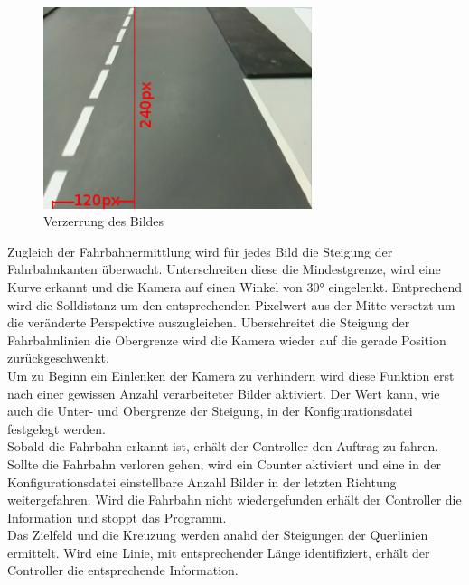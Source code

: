 \begin{figure}[H]%
\centering
\includegraphics[width=0.7\textwidth]{03_Loesungskonzept/pictures/Verzerrung.png}
\caption{Verzerrung des Bildes}
\label{fig:routeCorr}
\end{figure}
Zugleich der Fahrbahnermittlung wird für jedes Bild die Steigung der Fahrbahnkanten überwacht. Unterschreiten diese die Mindestgrenze, wird eine Kurve erkannt und die Kamera auf einen Winkel von 30° eingelenkt. Entprechend wird die Solldistanz um den entsprechenden Pixelwert aus der Mitte versetzt um die veränderte Perspektive auszugleichen. Uberschreitet die Steigung der Fahrbahnlinien die Obergrenze wird die Kamera wieder auf die gerade Position zurückgeschwenkt.\\
Um zu Beginn ein Einlenken der Kamera zu verhindern wird diese Funktion erst nach einer gewissen Anzahl verarbeiteter Bilder aktiviert. Der Wert kann, wie auch die Unter- und Obergrenze der Steigung, in der Konfigurationsdatei festgelegt werden.\\
Sobald die Fahrbahn erkannt ist, erhält der Controller den Auftrag zu fahren. Sollte die Fahrbahn verloren gehen, wird ein Counter aktiviert und eine in der Konfigurationsdatei einstellbare Anzahl Bilder in der letzten Richtung weitergefahren. Wird die Fahrbahn nicht wiedergefunden erhält der Controller die Information und stoppt das Programm.\\
Das Zielfeld und die Kreuzung werden anahd der Steigungen der Querlinien ermittelt. Wird eine Linie, mit entsprechender Länge identifiziert, erhält der Controller die entsprechende Information.
